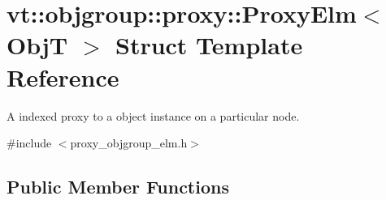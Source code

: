 \hypertarget{structvt_1_1objgroup_1_1proxy_1_1_proxy_elm}{}\section{vt\+:\+:objgroup\+:\+:proxy\+:\+:Proxy\+Elm$<$ ObjT $>$ Struct Template Reference}
\label{structvt_1_1objgroup_1_1proxy_1_1_proxy_elm}


A indexed proxy to a object instance on a particular node.  




{\ttfamily \#include $<$proxy\+\_\+objgroup\+\_\+elm.\+h$>$}

\subsection*{Public Member Functions}
